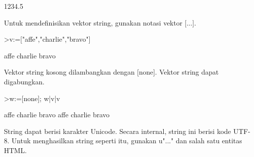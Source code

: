 \documentclass[a4paper,10pt]{article}
\begin{document}
\begin{eulernotebook}
\begin{eulercomment}
\begin{eulercomment}
\begin{euleroutput}
  1234.5
\end{euleroutput}
\begin{eulercomment}
Untuk mendefinisikan vektor string, gunakan notasi vektor [...].
\end{eulercomment}
\begin{eulerprompt}
>v:=["affe","charlie","bravo"]
\end{eulerprompt}
\begin{euleroutput}
  affe
  charlie
  bravo
\end{euleroutput}
\begin{eulercomment}
Vektor string kosong dilambangkan dengan [none]. Vektor string dapat
digabungkan.
\end{eulercomment}
\begin{eulerprompt}
>w:=[none]; w|v|v
\end{eulerprompt}
\begin{euleroutput}
  affe
  charlie
  bravo
  affe
  charlie
  bravo
\end{euleroutput}
\begin{eulercomment}
String dapat berisi karakter Unicode. Secara internal, string ini
berisi kode UTF-8. Untuk menghasilkan string seperti itu, gunakan
u"..." dan salah satu entitas HTML.


\end{eulercomment}
\end{eulercomment}
\end{eulercomment}
\end{eulernotebook}
\end{document}
